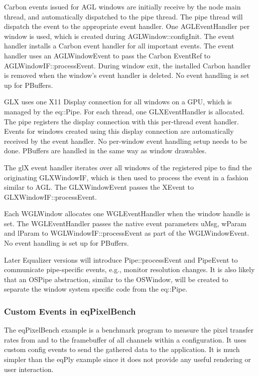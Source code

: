 \documentclass[10pt,a4]{scrartcl}
\begin{document}
Carbon events issued for AGL windows are initially receive by the node
main thread, and automatically dispatched to the pipe thread. The pipe
thread will dispatch the event to the appropriate event handler. One
\textsf{AGLEventHandler} per window is used, which is created during
\textsf{AGLWindow::configInit}. The event handler installs a Carbon
event handler for all important events. The event handler uses an
\textsf{AGLWindowEvent} to pass the Carbon \textsf{EventRef} to
\textsf{AGLWindowIF::processEvent}. During window exit, the installed
Carbon handler is removed when the window's event handler is deleted. No
event handling is set up for PBuffers.

GLX uses one X11 Display connection for all windows on a GPU, which is
managed by the \textsf{eq::Pipe}. For each thread, one
\textsf{GLXEventHandler} is allocated. The pipe registers the display
connection with this per-thread event handler. Events for windows
created using this display connection are automatically received by the
event handler. No per-window event handling setup needs to be
done. PBuffers are handled in the same way as window drawables.

The glX event handler iterates over all windows of the registered pipe
to find the originating \textsf{GLXWindowIF}, which is then used to
process the event in a fashion similar to AGL. The
\textsf{GLXWindowEvent} passes the \textsf{XEvent} to
\textsf{GLXWindowIF::\-process\-Event}.

Each \textsf{WGLWindow} allocates one \textsf{WGLEventHandler} when the
window handle is set. The WGLEventHandler passes the native event
parameters \textsf{uMsg}, \textsf{wParam} and \textsf{lParam} to
\textsf{WGL\-Win\-dowIF::processEvent} as part of the
\textsf{WGLWindowEvent}. No event handling is set up for PBuffers.

Later Equalizer versions will introduce \textsf{Pipe::pro\-cess\-Event} and
\textsf{PipeEvent} to communicate pipe-specific events, e.g., monitor
resolution changes. It is also likely that an \textsf{OSPipe}
abstraction, similar to the \textsf{OSWindow}, will be created to
separate the window system specific code from the \textsf{eq::Pipe}.


\subsubsection{Custom Events in eqPixelBench}

The \textsf{eqPixelBench} example is a benchmark program to measure the
pixel transfer rates from and to the framebuffer of all channels within
a configuration. It uses custom config events to send the gathered data
to the application. It is much simpler than the \textsf{eqPly} example
since it does not provide any useful rendering or user interaction.
\end{document}
